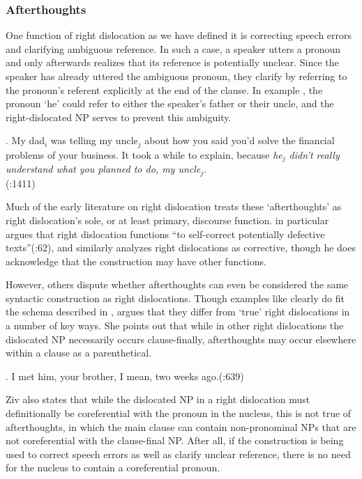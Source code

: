 \documentclass[titlepage,12pt]{article}
\begin{document}
\subsubsection{Afterthoughts}

One function of right dislocation as we have defined it is correcting speech errors and clarifying ambiguous reference. In such a case, a speaker utters a pronoun and only afterwards realizes that its reference is potentially unclear. Since the speaker has already uttered the ambiguous pronoun, they clarify by referring to the pronoun's referent explicitly at the end of the clause. In example \Next, the pronoun `he' could refer to either the speaker's father or their uncle, and the right-dislocated NP serves to prevent this ambiguity.

\ex. My dad$_i$ was telling my uncle$_j$ about how you said you'd solve the financial problems of your business. It took a while to explain, because \textit{he$_j$ didn't really understand what you planned to do, my uncle$_j$}.
\\ \phantom{x}
\hfill (\citealt{huddleston_cambridge_2002}:1411)

Much of the early literature on right dislocation treats these `afterthoughts' as right dislocation's sole, or at least primary, discourse function. \citet{tomlin_basic_1986} in particular argues that right dislocation functions ``to self-correct potentially defective texts''(\citeyear{tomlin_basic_1986}:62), and \citet{geluykens_tails_1987} similarly analyzes right dislocations as corrective, though he does acknowledge that the construction may have other functions. 

However, others dispute whether afterthoughts can even be considered the same syntactic construction as right dislocations. Though examples like \Last clearly do fit the schema described in \citealt{grosz_centering_1998}, \citet{ziv_left_1994} argues that they differ from `true' right dislocations in a number of key ways. She points out that while in other right dislocations the dislocated NP necessarily occurs clause-finally, afterthoughts may occur elsewhere within a clause as a parenthetical. 

\ex. I met him, your brother, I mean, two weeks ago.\hfill (\citealt{ziv_left_1994}:639)

Ziv also states that while the dislocated NP in a right dislocation must definitionally be coreferential with the pronoun in the nucleus, this is not true of afterthoughts, in which the main clause can contain non-pronominal NPs that are not coreferential with the clause-final NP. After all, if the construction is being used to correct speech errors as well as clarify unclear reference, there is no need for the nucleus to contain a coreferential pronoun.
\end{document}
